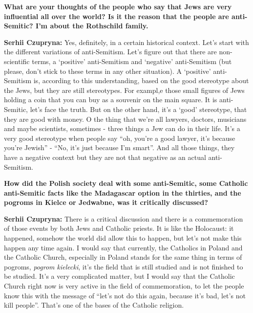 \textbf{What are your thoughts of the people who say that Jews are very influential all over the world? Is it the reason that the people are anti-Semitic? I’m about the Rothschild family.}\par
\textbf{Serhii Czupryna:} Yes, definitely, in a certain historical context. Let’s start with the different variations of anti-Semitism. Let’s figure out that there are non-scientific terms, a ‘positive’ anti-Semitism and ‘negative’ anti-Semitism (but please, don’t stick to these terms in any other situation). A ‘positive’ anti-Semitism is, according to this understanding, based on the good stereotype about the Jews, but they are still stereotypes. For exampl,e those small figures of Jews holding a coin that you can buy as a souvenir on the main square. It is anti-Semitic, let’s face the truth. But on the other hand, it’s a ‘good’ stereotype, that they are good with money. O the thing that we’re all lawyers, doctors, musicians and maybe scientists, sometimes - three things a Jew can do in their life. It’s a very good stereotype when people say “oh, you’re a good lawyer, it’s because you’re Jewish” - “No, it’s just because I’m smart”. And all those things, they have a negative context but they are not that negative as an actual anti-Semitism.\par
\textbf{How did the Polish society deal with some anti-Semitic, some Catholic anti-Semitic facts like the Madagascar option in the thirties, and the pogroms in Kielce or Jedwabne, was it critically discussed?}\par  
\textbf{Serhii Czupryna:} There is a critical discussion and there is a commemoration of those events by both Jews and Catholic priests. It is like the Holocaust: it happened, somehow the world did allow this to happen, but let’s not make this happen any time again. I would say that currently, the Catholics in Poland and the Catholic Church, especially in Poland stands for the same thing in terms of pogroms, \textit{pogrom kielecki}, it’s the field that is still studied and is not finished to be studied. It’s a very complicated matter, but I would say that the Catholic Church right now is very active in the field of commemoration, to let the people know this with the message of “let’s not do this again, because it’s bad, let’s not kill people”. That’s one of the bases of the Catholic religion.